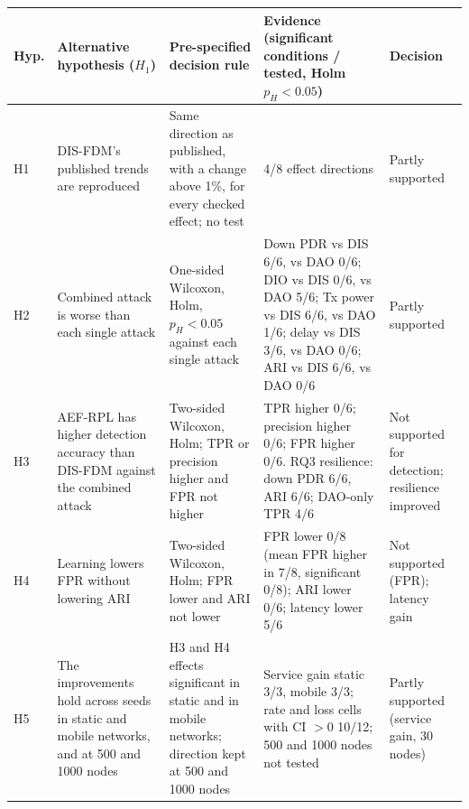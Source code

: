\begin{tabularx}{\textwidth}{@{}l>{\raggedright}p{}>{\raggedright}p{}X>{\raggedright\arraybackslash}p{}@{}}
\toprule
Hyp. & Alternative hypothesis ($H_1$) & Pre-specified decision rule & Evidence (significant conditions / tested, Holm $p_H<0.05$) & Decision\\
\midrule
H1 & DIS-FDM's published trends are reproduced & Same direction as published, with a change above 1\%, for every checked effect; no test & 4/8 effect directions & Partly supported \\
H2 & Combined attack is worse than each single attack & One-sided Wilcoxon, Holm, $p_H<0.05$ against each single attack & Down PDR vs DIS 6/6, vs DAO 0/6; DIO vs DIS 0/6, vs DAO 5/6; Tx power vs DIS 6/6, vs DAO 1/6; delay vs DIS 3/6, vs DAO 0/6; ARI vs DIS 6/6, vs DAO 0/6 & Partly supported \\
H3 & AEF-RPL has higher detection accuracy than DIS-FDM against the combined attack & Two-sided Wilcoxon, Holm; TPR or precision higher and FPR not higher & TPR higher 0/6; precision higher 0/6; FPR higher 0/6. RQ3 resilience: down PDR 6/6, ARI 6/6; DAO-only TPR 4/6 & Not supported for detection; resilience improved \\
H4 & Learning lowers FPR without lowering ARI & Two-sided Wilcoxon, Holm; FPR lower and ARI not lower & FPR lower 0/8 (mean FPR higher in 7/8, significant 0/8); ARI lower 0/6; latency lower 5/6 & Not supported (FPR); latency gain \\
H5 & The improvements hold across seeds in static and mobile networks, and at 500 and 1000 nodes & H3 and H4 effects significant in static and in mobile networks; direction kept at 500 and 1000 nodes & Service gain static 3/3, mobile 3/3; rate and loss cells with CI $>0$ 10/12; 500 and 1000 nodes not tested & Partly supported (service gain, 30 nodes) \\
\bottomrule
\end{tabularx}
